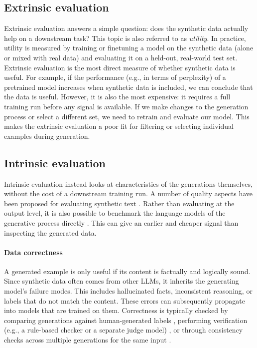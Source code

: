 \subsection{Extrinsic evaluation}
Extrinsic evaluation answers a simple question: does the synthetic data actually help on a downstream task? This topic is also referred to as \emph{utility}. In practice, utility is measured by training or finetuning a model on the synthetic data (alone or mixed with real data) and evaluating it on a held-out, real-world test set. Extrinsic evaluation is the most direct measure of whether synthetic data is useful. For example, if the performance (e.g., in terms of perplexity) of a pretrained model increases when synthetic data is included, we can conclude that the data is useful. However, it is also the most expensive: it requires a full training run before any signal is available. If we make changes to the generation process or select a different set, we need to retrain and evaluate our model. This makes the extrinsic evaluation a poor fit for filtering or selecting individual examples during generation.


\subsection{Intrinsic evaluation}
Intrinsic evaluation instead looks at characteristics of the generations themselves, without the cost of a downstream training run. A number of quality aspects have been proposed for evaluating synthetic text \citep{ramesh-etal-2025-synthtexteval}. Rather than evaluating at the output level, it is also possible to benchmark the language models of the generative process directly \citep{kim-etal-2025-evaluating}. This can give an earlier and cheaper signal than inspecting the generated data.


\paragraph{Data correctness}
A generated example is only useful if its content is factually and logically sound. Since synthetic data  often comes from other LLMs, it inherits the generating model's failure modes. This includes hallucinated facts, inconsistent reasoning, or labels that do not match the content. These errors can subsequently propagate into  models that are trained on them. Correctness is typically checked  by comparing generations against human-generated labels \citep{long-etal-2024-llms, chim-etal-2025-evaluating}, performing verification (e.g., a rule-based checker or a separate judge model) \citep{chen-etal-2025-mastering, yang-etal-2025-longfaith, NEURIPS2024_4b77d5b8}, or through consistency checks across multiple generations for the same input \citep{NEURIPS2022_639a9a17, seegmiller-etal-2025-flames}.


